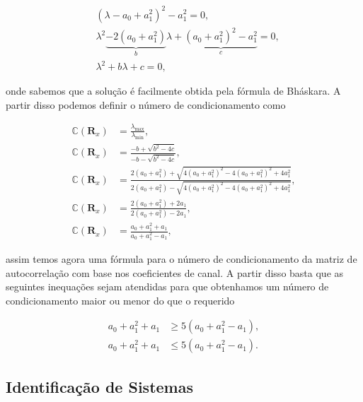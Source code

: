 \begin{align}
    &(\lambda - a_{0} + a^{2}_{1})^{2} - a^{2}_{1} = 0, \\
    &\lambda^{2} \underbrace{- 2 (a_{0} + a^{2}_{1})}_{b} \lambda + \underbrace{(a_{0} + a^{2}_{1})^{2} - a^{2}_{1}}_{c} = 0, \\
    &\lambda^{2} + b \lambda + c = 0,
\end{align}

onde sabemos que a solução é facilmente obtida pela fórmula de Bháskara. A partir disso podemos definir o número de condicionamento como

\begin{align}
    \mathbb{C} (\mathbf{R}_{x}) &= \frac{\lambda_{\text{max}}}{\lambda_{\text{min}}}, \\
    \mathbb{C} (\mathbf{R}_{x}) &= \frac{- b + \sqrt{b^{2} - 4c}}{- b - \sqrt{b^{2} - 4c}}, \\
    \mathbb{C} (\mathbf{R}_{x}) &= \frac{2 (a_{0} + a^{2}_{1}) + \sqrt{4 (a_{0} + a^{2}_{1})^{2} - 4 (a_{0} + a^{2}_{1})^{2} + 4 a^{2}_{1}}}{2 (a_{0} + a^{2}_{1}) - \sqrt{4 (a_{0} + a^{2}_{1})^{2} - 4 (a_{0} + a^{2}_{1})^{2} + 4 a^{2}_{1}}}, \\
    \mathbb{C} (\mathbf{R}_{x}) &= \frac{2 (a_{0} + a^{2}_{1}) + 2a_{1}}{2 (a_{0} + a^{2}_{1}) - 2a_{1}}, \\
    \mathbb{C} (\mathbf{R}_{x}) &= \frac{a_{0} + a^{2}_{1} + a_{1}}{a_{0} + a^{2}_{1} - a_{1}},
\end{align}

assim temos agora uma fórmula para o número de condicionamento da matriz de autocorrelação com base nos coeﬁcientes de canal. A partir disso basta que as seguintes inequações sejam atendidas para que
obtenhamos um número de condicionamento maior ou menor do que o requerido

\begin{align}
    a_{0} + a^{2}_{1} + a_{1} &\geq 5 (a_{0} + a^{2}_{1} - a_{1}), \\
    a_{0} + a^{2}_{1} + a_{1} &\leq 5 (a_{0} + a^{2}_{1} - a_{1}).
\end{align}

\clearpage


\subsection{Identificação de Sistemas} %

